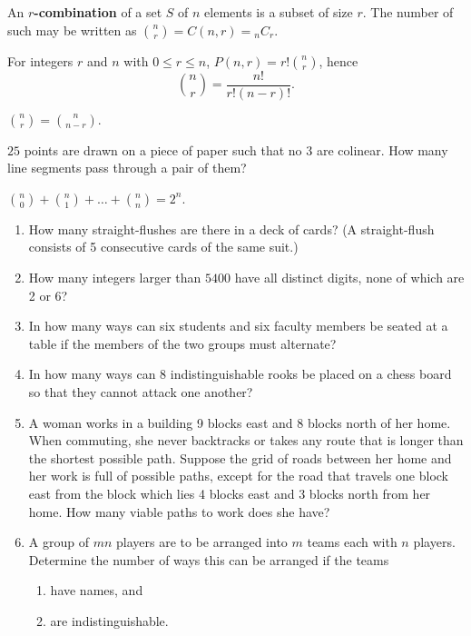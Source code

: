 \begin{definition} An \textbf{$r$-combination} of a set $S$ of $n$ elements is a subset of size $r$.  The number of such may be written as ${{n}\choose{r}} = C(n, r) = {}_n C_r$.
\end{definition}

\begin{theorem}For integers $r$ and $n$ with $0 \leq r \leq n$, $P(n, r) = r! {{n}\choose{r}}$, hence $${{n}\choose{r}} = \dfrac{n!}{r!(n-r)!}.$$
\end{theorem}

\begin{corollary} ${{n}\choose{r}} = {{n}\choose{n-r}}.$
\end{corollary}

\begin{example} $25$ points are drawn on a piece of paper such that no 3 are colinear.  How many line segments pass through a pair of them?
\end{example}

\begin{theorem} ${{n}\choose{0}} + {{n}\choose{1}} + \ldots + {{n}\choose{n}} = 2^n$.
\end{theorem}

\begin{exercises}\leavevmode
\begin{enumerate}
    \item How many straight-flushes are there in a deck of cards? (A straight-flush consists of 5 consecutive cards of the same suit.)
    \item How many integers larger than $5400$ have all distinct digits, none of which are 2 or 6?
    \item In how many ways can six students and six faculty members be seated at a table if the members of the two groups must alternate?
    \item In how many ways can 8 indistinguishable rooks be placed on a chess board so that they cannot attack one another?
    \item A woman works in a building 9 blocks east and 8 blocks north of her home.  When commuting, she never backtracks or takes any route that is longer than the shortest possible path.  Suppose the grid of roads between her home and her work is full of possible paths, except for the road that travels one block east from the block which lies 4 blocks east and 3 blocks north from her home.  How many viable paths to work does she have?
    \item A group of $mn$ players are to be arranged into $m$ teams each with $n$ players.  Determine the number of ways this can be arranged if the teams
    \begin{enumerate}
        \item have names, and
        \item are indistinguishable.
    \end{enumerate}
\end{enumerate}
\end{exercises}

